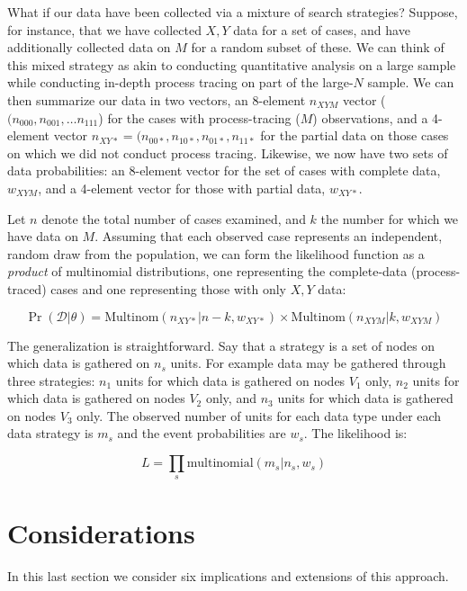 \documentclass[
  12pt,
]{book}
\begin{document}
What if our data have been collected via a mixture of search strategies? Suppose, for instance, that we have collected \(X,Y\) data for a set of cases, and have additionally collected data on \(M\) for a random subset of these. We can think of this mixed strategy as akin to conducting quantitative analysis on a large sample while conducting in-depth process tracing on part of the large-\(N\) sample. We can then summarize our data in two vectors, an 8-element \(n_{XYM}\) vector (\((n_{000},n_{001},\dots n_{111}\)) for the cases with process-tracing (\(M\)) observations, and a 4-element vector \(n_{XY*} = (n_{00*},n_{10*},n_{01*},n_{11*}\) for the partial data on those cases on which we did not conduct process tracing. Likewise, we now have two sets of data probabilities: an 8-element vector for the set of cases with complete data, \(w_{XYM}\), and a 4-element vector for those with partial data, \(w_{XY*}\).

Let \(n\) denote the total number of cases examined, and \(k\) the number for which we have data on \(M\). Assuming that each observed case represents an independent, random draw from the population, we can form the likelihood function as a \emph{product} of multinomial distributions, one representing the complete-data (process-traced) cases and one representing those with only \(X,Y\) data:

\[\Pr(\mathcal{D}|\theta) = 
  \text{Multinom}\left(n_{XY*}|n-k, w_{XY*}\right) \times \text{Multinom}\left(n_{XYM}|k, w_{XYM}\right)\]

The generalization is straightforward. Say that a strategy is a set of nodes on which data is gathered on \(n_s\) units. For example data may be gathered through three strategies: \(n_1\) units for which data is gathered on nodes \(V_1\) only, \(n_2\) units for which data is gathered on nodes \(V_2\) only, and \(n_3\) units for which data is gathered on nodes \(V_3\) only. The observed number of units for each data type under each data strategy is \(m_s\) and the event probabilities are \(w_s\). The likelihood is:

\[L = \prod_s \text{multinomial}(m_s|n_s, w_s)\]

\hypertarget{considerations}{%
\section{Considerations}\label{considerations}}

In this last section we consider six implications and extensions of this approach.
\end{document}
